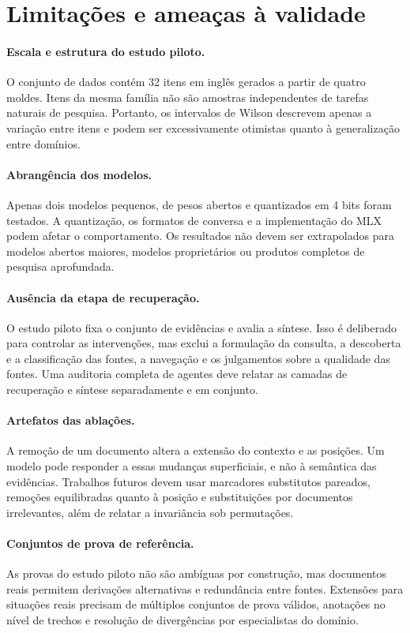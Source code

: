 \documentclass[10pt,twocolumn]{article}
\begin{document}
\section{Limitações e ameaças à validade}

\paragraph{Escala e estrutura do estudo piloto.}
O conjunto de dados contém 32 itens em inglês gerados a partir de quatro moldes. Itens da mesma família não são amostras independentes de tarefas naturais de pesquisa. Portanto, os intervalos de Wilson descrevem apenas a variação entre itens e podem ser excessivamente otimistas quanto à generalização entre domínios.

\paragraph{Abrangência dos modelos.}
Apenas dois modelos pequenos, de pesos abertos e quantizados em 4 bits foram testados. A quantização, os formatos de conversa e a implementação do MLX podem afetar o comportamento. Os resultados não devem ser extrapolados para modelos abertos maiores, modelos proprietários ou produtos completos de pesquisa aprofundada.

\paragraph{Ausência da etapa de recuperação.}
O estudo piloto fixa o conjunto de evidências e avalia a síntese. Isso é deliberado para controlar as intervenções, mas exclui a formulação da consulta, a descoberta e a classificação das fontes, a navegação e os julgamentos sobre a qualidade das fontes. Uma auditoria completa de agentes deve relatar as camadas de recuperação e síntese separadamente e em conjunto.

\paragraph{Artefatos das ablações.}
A remoção de um documento altera a extensão do contexto e as posições. Um modelo pode responder a essas mudanças superficiais, e não à semântica das evidências. Trabalhos futuros devem usar marcadores substitutos pareados, remoções equilibradas quanto à posição e substituições por documentos irrelevantes, além de relatar a invariância sob permutações.

\paragraph{Conjuntos de prova de referência.}
As provas do estudo piloto não são ambíguas por construção, mas documentos reais permitem derivações alternativas e redundância entre fontes. Extensões para situações reais precisam de múltiplos conjuntos de prova válidos, anotações no nível de trechos e resolução de divergências por especialistas do domínio.
\end{document}
